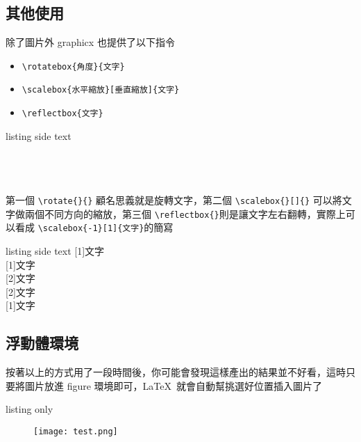 \subsection{其他使用}

除了圖片外 graphicx 也提供了以下指令

\begin{itemize}
\item \verb|\rotatebox{角度}{文字}|
\item \verb|\scalebox{水平縮放}[垂直縮放]{文字}|
\item \verb|\reflectbox{文字}|
\end{itemize}

\begin{tcblisting}{listing side text}
\\
\\
\\
\\
\end{tcblisting}

第一個 \verb|\rotate{}{}| 顧名思義就是旋轉文字，第二個 \verb|\scalebox{}[]{}| 可以將文字做兩個不同方向的縮放，第三個 \verb|\reflectbox{}|則是讓文字左右翻轉，實際上可以看成 \verb|\scalebox{-1}[1]{文字}|的簡寫

\begin{tcblisting}{listing side text}
\scalebox{1}[1]{文字}\\
\scalebox{2}[1]{文字}\\
\scalebox{1}[2]{文字}\\
\scalebox{2}[2]{文字}\\
\scalebox{-1}[1]{文字}\\
\end{tcblisting}

\subsection{浮動體環境}

按著以上的方式用了一段時間後，你可能會發現這樣產出的結果並不好看，這時只要將圖片放進 figure 環境即可，\LaTeX\ 就會自動幫挑選好位置插入圖片了

\begin{tcblisting}{listing only}
\begin{figure}
\texttt{[image: test.png]}
\end{figure}
\end{tcblisting}

